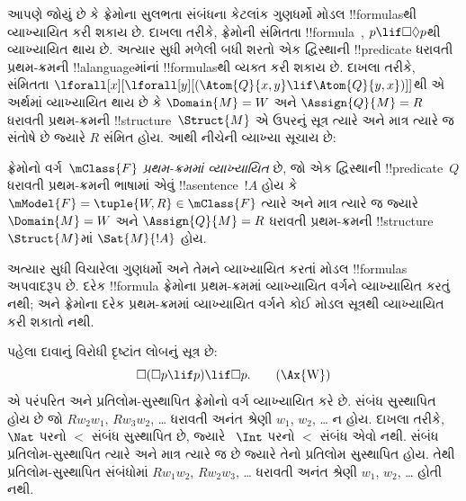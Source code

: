 \documentclass[../../../include/open-logic-section]{subfiles}
\begin{document}


આપણે જોયું છે કે ફ્રેમોના સુલભતા સંબંધના કેટલાંક
ગુણધર્મો મોડલ !!{formula}sથી વ્યાખ્યાયિત કરી શકાય છે.
દાખલા તરીકે, ફ્રેમોની સંમિતતા !!{formula}~,
$p \lif \Box\Diamond
p$થી વ્યાખ્યાયિત થાય છે. અત્યાર સુધી મળેલી બધી
શરતો એક દ્વિસ્થાની !!{predicate} ધરાવતી
પ્રથમ-ક્રમની !!a{language}માંનાં !!{formula}sથી
વ્યક્ત કરી શકાય છે. દાખલા તરીકે, સંમિતતા
$\lforall[x][\lforall[y][(\Atom{Q}{x,y} \lif \Atom{Q}{y, x})]]$થી
એ અર્થમાં વ્યાખ્યાયિત થાય છે કે $\Domain{M} =
W$ અને $\Assign{Q}{M} = R$ ધરાવતી પ્રથમ-ક્રમની
!!{structure}~$\Struct{M}$ એ ઉપરનું સૂત્ર ત્યારે અને
માત્ર ત્યારે જ સંતોષે છે જ્યારે $R$ સંમિત હોય.
આથી નીચેની વ્યાખ્યા સૂચાય છે:

\begin{defn}
  ફ્રેમોનો વર્ગ~$\mClass{F}$ \emph{પ્રથમ-ક્રમમાં વ્યાખ્યાયિત}
  છે, જો એક દ્વિસ્થાની !!{predicate}~$Q$ ધરાવતી
  પ્રથમ-ક્રમની ભાષામાં એવું !!a{sentence}~$!A$
  હોય કે $\mModel{F} =
  \tuple{W, R} \in \mClass{F}$ ત્યારે અને માત્ર ત્યારે જ
  જ્યારે $\Domain{M} = W$ અને $\Assign{Q}{M}
  = R$ ધરાવતી પ્રથમ-ક્રમની !!{structure}~$\Struct{M}$માં
  $\Sat{M}{!A}$ હોય.
\end{defn}

અત્યાર સુધી વિચારેલા ગુણધર્મો અને તેમને વ્યાખ્યાયિત
કરતાં મોડલ !!{formula}s અપવાદરૂપ છે. દરેક
!!{formula} ફ્રેમોના પ્રથમ-ક્રમમાં વ્યાખ્યાયિત વર્ગને
વ્યાખ્યાયિત કરતું નથી; અને ફ્રેમોના દરેક પ્રથમ-ક્રમમાં
વ્યાખ્યાયિત વર્ગને કોઈ મોડલ સૂત્રથી વ્યાખ્યાયિત
કરી શકાતો નથી.

પહેલા દાવાનું વિરોધી દૃષ્ટાંત લોબનું સૂત્ર છે:
\begin{equation}
\Box(\Box p \lif p) \lif \Box p. \tag{\Ax{W}}
\end{equation}
 એ પરંપરિત અને પ્રતિલોમ-સુસ્થાપિત ફ્રેમોનો
વર્ગ વ્યાખ્યાયિત કરે છે. સંબંધ સુસ્થાપિત હોય છે જો
$Rw_2w_1$, $Rw_3w_2$, \dots{} ધરાવતી અનંત શ્રેણી
$w_1$, $w_2$, \dots{} ન હોય. દાખલા તરીકે,
~$\Nat$ પરનો $<$ સંબંધ સુસ્થાપિત છે, જ્યારે
~$\Int$ પરનો $<$ સંબંધ એવો નથી. સંબંધ
પ્રતિલોમ-સુસ્થાપિત ત્યારે અને માત્ર ત્યારે જ છે
જ્યારે તેનો પ્રતિલોમ સુસ્થાપિત હોય. તેથી
પ્રતિલોમ-સુસ્થાપિત સંબંધોમાં $Rw_1w_2$,
$Rw_2w_3$, \dots{} ધરાવતી અનંત શ્રેણી
$w_1$, $w_2$, \dots{} હોતી નથી.
\end{document}
